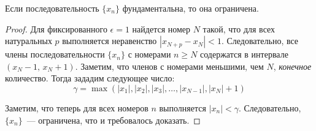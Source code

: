 \begin{lemma} \label{lemma_Koshi}
Если последовательность \(\{x_{n}\}\) фундаментальна, то она ограничена.

\begin{proof}
Для фиксированного \(\epsilon = 1\) найдется номер \(N\) такой, что
для всех натуральных \(p\) выполняется неравенство \(|x_{N+p} - x_{N}| < 1\).
Следовательно, все члены последовательности \(\{x_{n}\}\) с номерами \(n \geq N\)
содержатся в интервале \((x_{N} - 1, \, x_{N} + 1)\). Заметим, что членов с номерами
меньшими, чем \(N\), \textit{конечное} количество. Тогда зададим следующее число:
\[
\gamma = \max(|x_{1}|, |x_{2}|, |x_{3}|, \dots, |x_{N-1}|, |x_{N}| + 1)
\]

Заметим, что теперь для всех номеров \(n\) выполняется \(|x_{n}| < \gamma\).
Следовательно, \(\{x_{n}\}\)~--- ограничена, что и требовалось доказать.
\end{proof}
\end{lemma}

